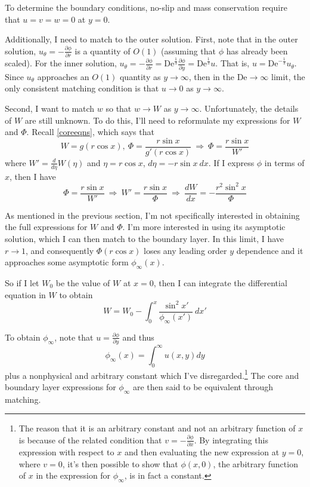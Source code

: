 \documentclass[10pt,a4paper]{report}
\begin{document}
To determine the boundary conditions, no-slip and mass conservation require that $u = v = w = 0$ at $y = 0$.

Additionally, I need to match to the outer solution. First, note that in the outer solution, $u_\theta = -\frac{\partial \phi}{\partial r}$ is a quantity of $O(1)$ (assuming that $\phi$ has already been scaled). For the inner solution, $u_\theta = -\frac{\partial \phi}{\partial r} = \textrm{De}^{\frac{1}{3}} \frac{\partial \phi}{\partial y} = \textrm{De}^{\frac{1}{3}} u$. That is, $u = \textrm{De}^{-\frac{1}{3}} u_\theta$. Since $u_\theta$ approaches an $O(1)$ quantity as $y \rightarrow \infty$, then in the $\textrm{De} \rightarrow \infty$ limit, the only consistent matching condition is that $u \rightarrow 0$ as $y \rightarrow \infty$.

Second, I want to match $w$ so that $w \rightarrow W$ as $y \rightarrow \infty$. Unfortunately, the details of $W$ are still unknown. To do this, I'll need to reformulate my expressions for $W$ and $\Phi$. Recall \eqref{coreeqns}, which says that
\begin{equation*}
W = g(r \cos x), \ \Phi = \frac{r \sin x}{g'(r \cos x)} \ \Rightarrow \ \Phi = \frac{r \sin x}{W'}
\end{equation*}
where $W' = \frac{d}{d \eta} W(\eta)$ and $\eta = r \cos x$, $d\eta = - r \sin x \ dx$. If I express $\phi$ in terms of $x$, then I have
\begin{equation*}
\Phi = \frac{r \sin x}{W'} \ \Rightarrow \ W' = \frac{r \sin x}{\Phi} \ \Rightarrow \ \frac{d W}{d x} = - \frac{r^2 \sin^2 x}{\Phi}
\end{equation*}

As mentioned in the previous section, I'm not specifically interested in obtaining the full expressions for $W$ and $\Phi$. I'm more interested in using its asymptotic solution, which I can then match to the boundary layer. In this limit, I have $r \rightarrow 1$, and consequently $\Phi(r \cos x)$ loses any leading order $y$ dependence and it approaches some asymptotic form $\phi_\infty (x)$.

So if I let $W_0$ be the value of $W$ at $x = 0$, then I can integrate the differential equation in $W$ to obtain
\begin{equation}
W = W_0 - \int_0^x \frac{\sin^2 x'}{\phi_\infty(x')} \ dx'
\end{equation}

To obtain $\phi_\infty$, note that $u = \frac{\partial \phi}{\partial y}$ and thus
\begin{equation*}
\phi_\infty(x) = \int_0^\infty u(x, y) dy
\end{equation*}
plus a nonphysical and arbitrary constant which I've disregarded.\footnote{The reason that it is an arbitrary constant and not an arbitrary function of $x$ is because of the related condition that $v = -\frac{\partial \phi}{\partial x}$. By integrating this expression with respect to $x$ and then evaluating the new expression at $y = 0$, where $v = 0$, it's then possible to show that $\phi(x,0)$, the arbitrary function of $x$ in the expression for $\phi_\infty$, is in fact a constant.} The core and boundary layer expressions for $\phi_\infty$ are then said to be equivalent through matching.
\end{document}
